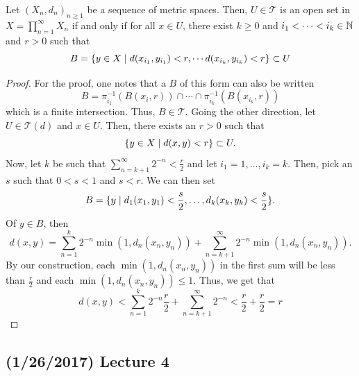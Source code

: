 \documentclass[11pt,leqno,oneside]{amsbook}
\numberwithin{thm}{section}
\newcommand{\Top}{\mathcal{T}} %
\begin{document}
\begin{prop}
  Let $(X_n,d_n)_{n \geq 1}$ be a sequence of metric spaces. Then, $U
  \in \Top$ is an open set in $X = \prod_{n=1}^\infty X_n$ if and only
  if for all $x \in U$, there exist $k \geq 0$ and $i_1 < \cdots <
  i_k \in {\mathbb N}$ and $r > 0$ such that \[
    B = \{y \in X \mid d(x_{i_1},y_{i_1}) < r, \cdots
    d(x_{i_k},y_{i_k}) < r\} \subset U
  \]
\end{prop}
\begin{proof}
  For the proof, one notes that a $B$ of this form can also be written \[
    B = \pi_{i_1}^{-1}(B(x_i,r)) \cap \cdots \cap \pi_{i_k}^{-1}(B(x_{i_k},r))
  \]
  which is a finite intersection. Thus, $B \in \Top$. Going the other
  direction, let $U \in \Top(d)$ and $x \in U$. Then, there exists an
  $r > 0$ such that \[
    \{y \in X \mid d(x,y) < r\} \subset U.
  \]
  Now, let $k$ be such that $\sum_{n=k+1}^\infty 2^{-n} <
  \frac{r}{2}$ and let $i_1 = 1, \ldots, i_k = k$. Then, pick an $s$
  such that $0 < s < 1$ and $s < r$. We can then set \[
    B = \{y \mid d_1(x_1,y_1) < \frac{s}{2}, \ldots, d_k(x_k,y_k) < \frac{s}{2} \}.
  \]
  Of $y \in B$, then \[
    d(x,y) = \sum_{n=1}^k 2^{-n} \min(1,d_n(x_n,y_n)) +
    \sum_{n=k+1}^\infty 2^{-n} \min(1,d_n(x_n,y_n)).
  \]
  By our construction, each $\min(1,d_n(x_n,y_n))$ in the first sum will be less than
  $\frac{r}{2}$ and each $\min(1,d_n(x_n,y_n)) \leq 1$. Thus, we get
  that \[
    d(x,y) < \sum_{n=1}^k 2^{-n} \frac{r}{2} + \sum_{n=k+1}^\infty
    2^{-n} < \frac{r}{2} + \frac{r}{2} = r
  \]
\end{proof}
\subsection*{(1/26/2017) Lecture 4}
\end{document}

